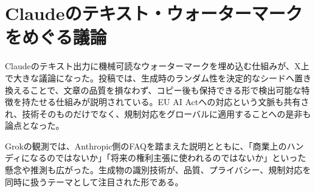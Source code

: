 \section{Claudeのテキスト・ウォーターマークをめぐる議論}

Claudeのテキスト出力に機械可読なウォーターマークを埋め込む仕組みが、X上で大きな議論になった。投稿では、生成時のランダム性を決定的なシードへ置き換えることで、文章の品質を損なわず、コピー後も保持できる形で検出可能な特徴を持たせる仕組みが説明されている。EU AI Actへの対応という文脈も共有され、技術そのものだけでなく、規制対応をグローバルに適用することへの是非も論点となった。

Grokの観測では、Anthropic側のFAQを踏まえた説明とともに、「商業上のハンディになるのではないか」「将来の権利主張に使われるのではないか」といった懸念や推測も広がった。生成物の識別技術が、品質、プライバシー、規制対応を同時に扱うテーマとして注目された形である。
